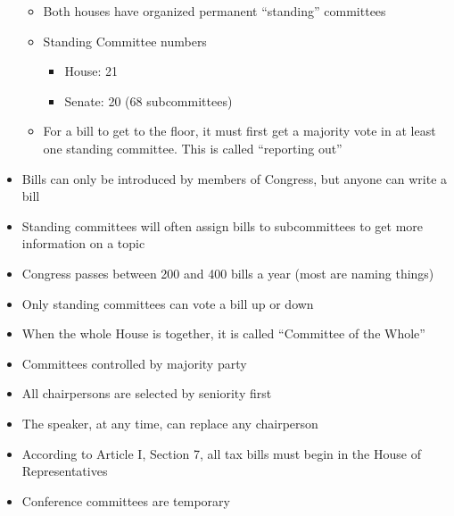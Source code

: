 \documentclass[12pt]{article}
\begin{document}
\begin{itemize}
    \begin{itemize}

      \item Both houses have organized permanent “standing” committees

      \item Standing Committee numbers

        \begin{itemize}

          \item House: 21

          \item Senate: 20 (68 subcommittees)

        \end{itemize}

      \item For a bill to get to the floor, it must first get a majority vote in at least one standing committee. This is called “reporting out”

    \end{itemize}

  \item Bills can only be introduced by members of Congress, but anyone can write a bill

  \item Standing committees will often assign bills to subcommittees to get more information on a topic

  \item Congress passes between 200 and 400 bills a year (most are naming things)

  \item Only standing committees can vote a bill up or down

  \item When the whole House is together, it is called “Committee of the Whole”

  \item Committees controlled by majority party

  \item All chairpersons are selected by seniority first

  \item The speaker, at any time, can replace any chairperson

  \item According to Article I, Section 7, all tax bills must begin in the House of Representatives

  \item Conference committees are temporary

\end{itemize}
\end{document}

